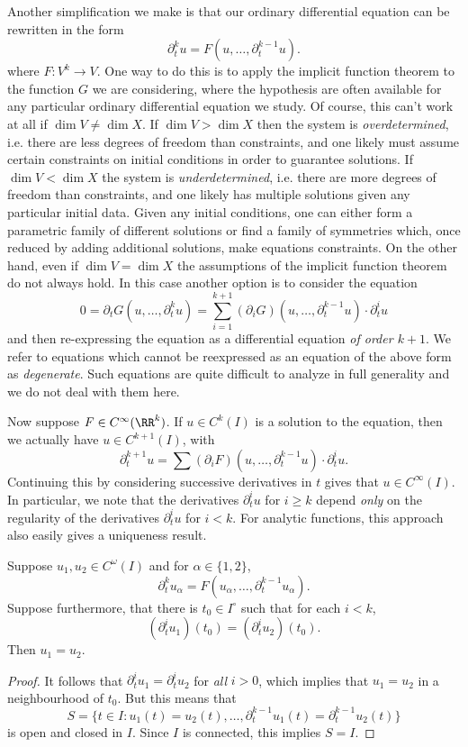 Another simplification we make is that our ordinary differential equation can be rewritten in the form
%
\[ \partial_t^k u = F(u,\dots, \partial_t^{k-1} u). \]
%
where $F: V^k \to V$. One way to do this is to apply the implicit function theorem to the function $G$ we are considering, where the hypothesis are often available for any particular ordinary differential equation we study. Of course, this can't work at all if $\dim V \neq \dim X$. If $\dim V > \dim X$ then the system is \emph{overdetermined}, i.e. there are less degrees of freedom than constraints, and one likely must assume certain constraints on initial conditions in order to guarantee solutions. If $\dim V < \dim X$ the system is \emph{underdetermined}, i.e. there are more degrees of freedom than constraints, and one likely has multiple solutions given any particular initial data. Given any initial conditions, one can either form a parametric family of different solutions or find a family of symmetries which, once reduced by adding additional solutions, make equations constraints. On the other hand, even if $\dim V = \dim X$ the assumptions of the implicit function theorem do not always hold. In this case another option is to consider the equation
%
\[ 0 = \partial_t G(u,\dots,\partial_t^ku) = \sum_{i = 1}^{k+1} (\partial_i G)(u,\dots,\partial_t^{k-1} u) \cdot \partial_t^i u \]
%
and then re-expressing the equation as a differential equation \emph{of order $k+1$}. We refer to equations which cannot be reexpressed as an equation of the above form as \emph{degenerate}. Such equations are quite difficult to analyze in full generality and we do not deal with them here.

Now suppose $F \in C^\infty(\RR^k)$. If $u \in C^k(I)$ is a solution to the equation, then we actually have $u \in C^{k+1}(I)$, with
%
\[ \partial_t^{k+1} u = \sum (\partial_i F)(u,\dots,\partial_t^{k-1}u) \cdot \partial_t^i u. \]
%
Continuing this by considering successive derivatives in $t$ gives that $u \in C^\infty(I)$. In particular, we note that the derivatives $\partial_t^i u$ for $i \geq k$ depend \emph{only} on the regularity of the derivatives $\partial_t^i u$ for $i < k$. For analytic functions, this approach also easily gives a uniqueness result.

\begin{lemma}
    Suppose $u_1,u_2 \in C^\omega(I)$ and for $\alpha \in \{ 1, 2 \}$,
    \[ \partial_t^k u_\alpha = F(u_\alpha, \dots, \partial_t^{k-1} u_\alpha). \]
    Suppose furthermore, that there is $t_0 \in I^\circ$ such that for each $i < k$,
    \[ (\partial_t^i u_1)(t_0) = (\partial_t^i u_2)(t_0). \]
    Then $u_1 = u_2$.
\end{lemma}
\begin{proof}
    It follows that $\partial_t^i u_1 = \partial_t^i u_2$ for \emph{all} $i > 0$, which implies that $u_1 = u_2$ in a neighbourhood of $t_0$. But this means that
    \[ S = \{ t \in I: u_1(t) = u_2(t), \dots, \partial_t^{k-1} u_1(t) = \partial_t^{k-1} u_2(t) \} \]
    is open and closed in $I$. Since $I$ is connected, this implies $S = I$.
\end{proof}

